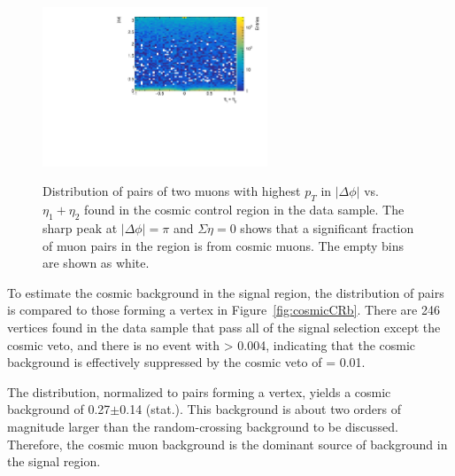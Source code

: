 \begin{figure}[!htb]
    \begin{center}
    \includegraphics[width=0.6\textwidth]{figures/Cosmics/DataValidation/mup_seta_dphi.pdf}
    \label{fig:cosmicData}
    \caption{Distribution of pairs of two muons with highest $p_{T}$ in $|\Delta \phi|$ vs. $\eta_{1}+\eta_{2}$ found in the cosmic control region in the data sample. The sharp peak at $|\Delta\phi| = \pi$ and $\Sigma \eta = 0$ shows that a significant fraction of muon pairs in the region is from cosmic muons. The empty bins are shown as white.}
\end{center}
\end{figure}

To estimate the cosmic background in the signal region, the \Rcr distribution of \mumu pairs is compared to those forming a vertex in Figure~\ref{fig:cosmicCRb}. There are 246 \mumu vertices found in the data sample that pass all of the signal selection except the cosmic veto, and there is no event with \Rcr > 0.004, indicating that the cosmic background is effectively suppressed by the cosmic veto of \Rcr = 0.01.

The \Rcr distribution, normalized to \mumu pairs forming a vertex, yields a cosmic background of 0.27$\pm$0.14 (stat.). This background is about two orders of magnitude larger than the random-crossing background to be discussed. Therefore, the cosmic muon background is the dominant source of background in the signal region.


